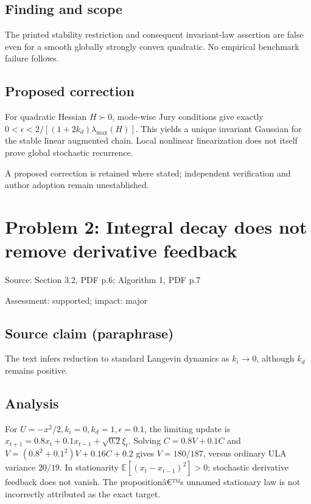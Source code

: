 \documentclass[11pt]{article}
\begin{document}
\subsection*{Finding and scope}

The printed stability restriction and consequent invariant-law assertion are false even for a smooth globally strongly convex quadratic. No empirical benchmark failure follows.

\subsection*{Proposed correction}

For quadratic Hessian \(H\succ0\), mode-wise Jury conditions give exactly \(0<\epsilon<2/[(1+2k_d)\lambda_{\max}(H)]\). This yields a unique invariant Gaussian for the stable linear augmented chain. Local nonlinear linearization does not itself prove global stochastic recurrence.

A proposed correction is retained where stated; independent verification and author adoption remain unestablished.

\section*{Problem 2: Integral decay does not remove derivative feedback}

Source: Section 3.2, PDF p.6; Algorithm 1, PDF p.7

Assessment: supported; impact: major

\subsection*{Source claim (paraphrase)}

The text infers reduction to standard Langevin dynamics as \(k_i\to0\), although \(k_d\) remains positive.

\subsection*{Analysis}

For \(U=-x^2/2,k_i=0,k_d=1,\epsilon=0.1\), the limiting update is \(x_{t+1}=0.8x_t+0.1x_{t-1}+\sqrt{0.2}\xi_t\). Solving \(C=0.8V+0.1C\) and \(V=(0.8^2+0.1^2)V+0.16C+0.2\) gives \(V=180/187\), versus ordinary ULA variance \(20/19\). In stationarity \(\mathbb E[(x_t-x_{t-1})^2]>0\); stochastic derivative feedback does not vanish. The propositionâ€™s unnamed stationary law is not incorrectly attributed as the exact target.
\end{document}

